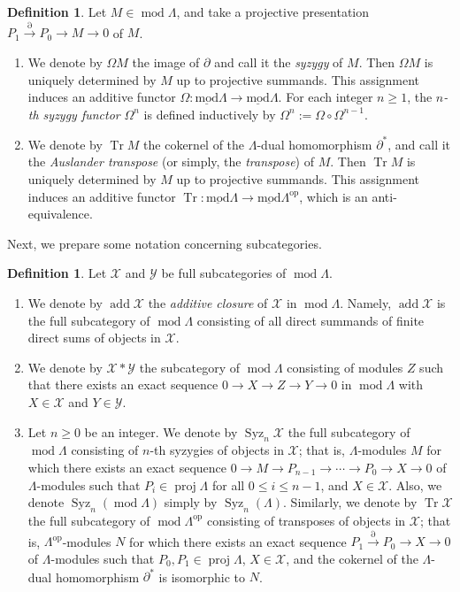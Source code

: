 \documentclass{amsart}
\theoremstyle{definition}
\newtheorem{dfn}[thm]{Definition}
\theoremstyle{remark}
\numberwithin{equation}{thm}
\def\add{\operatorname{add}}
\def\ge{\geqslant}
\def\le{\leqslant}
\def\lmod{\operatorname{\underline{mod}}}
\def\mod{\operatorname{mod}}
\def\proj{\operatorname{proj}}
\def\syz{\Omega}
\def\Syz{\operatorname{Syz}}
\def\tr{\operatorname{Tr}}
\def\X{\mathcal{X}}
\def\Y{\mathcal{Y}}
\begin{document}
\begin{dfn}
Let $M \in \mod\Lambda$, and take a projective presentation $P_1 \xrightarrow{\partial} P_0 \to M \to 0$ of $M$.
\begin{enumerate}[\rm(1)]
  \item
  We denote by $\syz M$ the image of $\partial$ and call it the {\em syzygy} of $M$.
  Then $\syz M$ is uniquely determined by $M$ up to projective summands.
  This assignment induces an additive functor $\syz : \lmod\Lambda \to \lmod\Lambda$.
  For each integer $n \ge 1$, the {\em $n$-th syzygy functor} $\syz^n$ is defined inductively by $\syz^n := \syz \circ \syz^{n-1}$.
  \item
  We denote by $\tr M$ the cokernel of the $\Lambda$-dual homomorphism $\partial^\ast$, and call it the {\em Auslander transpose} (or simply, the {\em transpose}) of $M$.
  Then $\tr M$ is uniquely determined by $M$ up to projective summands.
  This assignment induces an additive functor $\tr : \lmod\Lambda \to \lmod{\Lambda^{\mathrm{op}}}$, which is an anti-equivalence.
\end{enumerate}
\end{dfn}

Next, we prepare some notation concerning subcategories.

\begin{dfn}
Let $\X$ and $\Y$ be full subcategories of $\mod\Lambda$.
\begin{enumerate}[\rm(1)]
  \item
  We denote by $\add\X$ the {\em additive closure} of $\X$ in $\mod\Lambda$.
  Namely, $\add\X$ is the full subcategory of $\mod\Lambda$ consisting of all direct summands of finite direct sums of objects in $\X$.
  \item We denote by $\X\ast\Y$ the subcategory of $\mod\Lambda$ consisting of modules $Z$ such that there exists an exact sequence $0\to X\to Z\to Y\to 0$ in $\mod\Lambda$ with $X\in \X$ and $Y\in\Y$.
  \item
  Let $n \ge 0$ be an integer.
  We denote by $\Syz_n\X$ the full subcategory of $\mod\Lambda$ consisting of $n$-th syzygies of objects in $\X$; that is, $\Lambda$-modules $M$ for which there exists an exact sequence
  $0 \to M \to P_{n-1} \to \cdots \to P_0 \to X \to 0$ of $\Lambda$-modules such that $P_i \in \proj\Lambda$ for all $0 \le i \le n-1$, and $X \in \X$.
  Also, we denote $\Syz_n(\mod\Lambda)$ simply by $\Syz_n(\Lambda)$.
  Similarly, we denote by $\tr\X$ the full subcategory of $\mod{\Lambda^{\mathrm{op}}}$ consisting of transposes of objects in $\X$; that is, $\Lambda^{\mathrm{op}}$-modules $N$ for which there exists an exact sequence $P_1 \xrightarrow{\partial} P_0 \to X \to 0$ of $\Lambda$-modules such that $P_0, P_1 \in \proj\Lambda$, $X \in \X$, and the cokernel of the $\Lambda$-dual homomorphism $\partial^\ast$ is isomorphic to $N$.
\end{enumerate}
\end{dfn}
\end{document}
